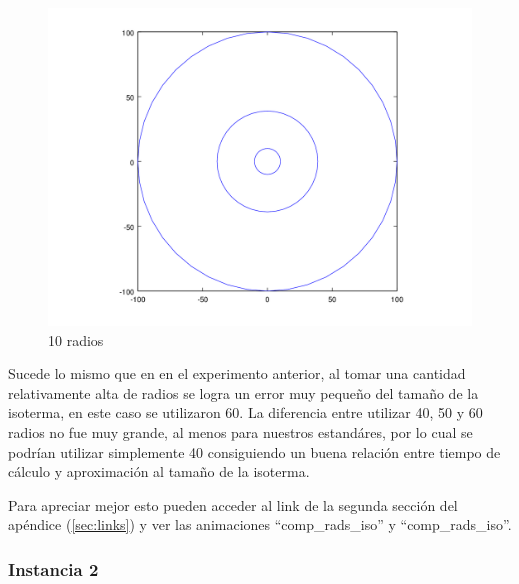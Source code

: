 \begin{figure}[H]
\begin{minipage}{0.30\textwidth}
  \centering
    \includegraphics[width=1\textwidth]{imgs/comp_rads_malo/comp_rads_iso0.png} 
	\caption{10 radios} 
  \label{fig:Radios6}
\end{minipage}
\end{figure}

Sucede lo mismo que en en el experimento anterior, al tomar una cantidad relativamente alta de radios se logra un error muy pequeño del tamaño de la isoterma, en este caso se utilizaron 60. La diferencia entre utilizar 40, 50 y 60 radios no fue muy grande, al menos para nuestros estandáres, por lo cual se podrían utilizar simplemente 40 consiguiendo un buena relación entre tiempo de cálculo y aproximación al tamaño de la isoterma.

Para apreciar mejor esto pueden acceder al link de la segunda sección del apéndice (\ref{sec:links}) y ver las animaciones ``comp\_rads\_iso'' y ``comp\_rads\_iso''.




\subsubsection*{Instancia 2}

